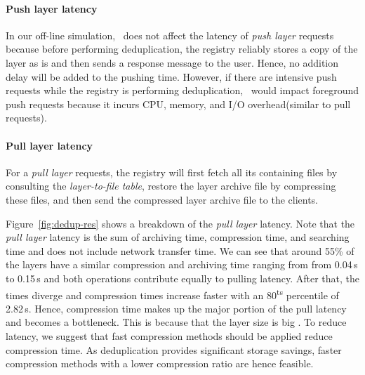 \paragraph{Push layer latency}

In our off-line simulation,
\sysname\ does not affect the latency of \emph{push layer} requests
because before performing deduplication, the registry reliably stores
a copy of the layer as is and then sends a response message to the user.
%
Hence, no addition delay will be added to the pushing time. 
%
However, 
if there are intensive push requests while the registry is performing deduplication,
\sysname\ would impact foreground push requests because it incurs 
CPU, memory, and I/O overhead(similar to pull requests).

\paragraph{Pull layer latency} 

For a \emph{pull layer} requests, the registry will first fetch 
all its containing files by consulting the \emph{layer-to-file table}, 
restore the layer archive file by compressing these files, and
then send the compressed layer archive file to the clients.

Figure~\ref{fig:dedup-res} shows a breakdown of the \emph{pull layer}
latency.
%
Note that the \emph{pull layer} latency is the sum of archiving time,
compression time, and searching time and does not include network transfer
time. 
%
We can see that around 55\% of the layers have a similar compression and archiving
time ranging from from 0.04\,s to 0.15\,s and both operations contribute equally
to pulling latency.
%
%
After that, the times diverge and compression times increase faster with an
80\textsuperscript{ts} percentile of 2.82\,s. Hence, compression time makes
up the major portion of the pull latency and becomes a bottleneck.
This is because that the layer size is big
.
%
%
To reduce latency, we suggest that fast compression methods should be applied reduce
compression time. As deduplication provides significant storage savings, faster compression
methods with a lower compression ratio are hence feasible.

